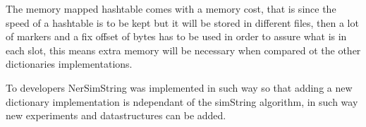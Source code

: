 The memory mapped hashtable comes with a memory cost, that is since the speed of  a hashtable is to be kept but it will be stored in different files, then a lot of markers and a fix offset of bytes has to be used in order to assure what is in each slot, this means extra memory will be necessary when compared ot the other dictionaries implementations.

To developers NerSimString was implemented in such way so that adding a new dictionary implementation is ndependant of the simString algorithm, in such way new experiments and datastructures can be added.



